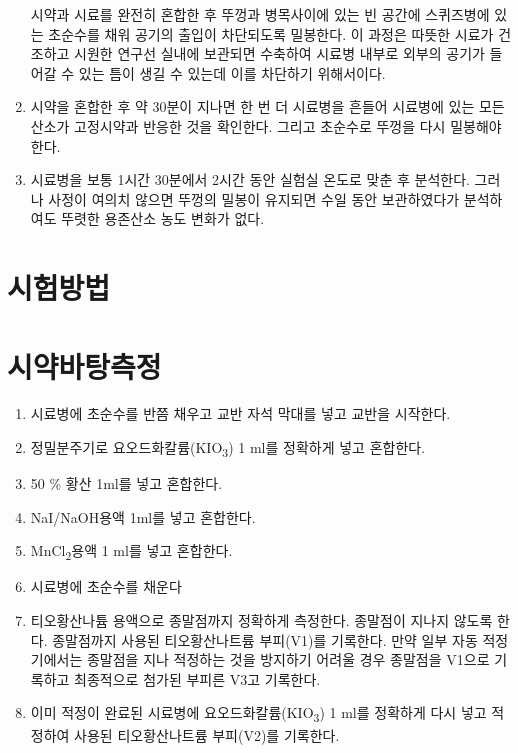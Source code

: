 \documentclass[
]{book}
\providecommand{\tightlist}{%
  \setlength{\itemsep}{0pt}\setlength{\parskip}{0pt}}
\begin{document}
\begin{enumerate}
  시약과 시료를 완전히 혼합한 후 뚜껑과 병목사이에 있는 빈 공간에 스퀴즈병에 있는 초순수를 채워 공기의 출입이 차단되도록 밀봉한다. 이 과정은 따뜻한 시료가 건조하고 시원한 연구선 실내에 보관되면 수축하여 시료병 내부로 외부의 공기가 들어갈 수 있는 틈이 생길 수 있는데 이를 차단하기 위해서이다.
\item
  시약을 혼합한 후 약 30분이 지나면 한 번 더 시료병을 흔들어 시료병에 있는 모든 산소가 고정시약과 반응한 것을 확인한다. 그리고 초순수로 뚜껑을 다시 밀봉해야 한다.
\item
  시료병을 보통 1시간 30분에서 2시간 동안 실험실 온도로 맞춘 후 분석한다. 그러나 사정이 여의치 않으면 뚜껑의 밀봉이 유지되면 수일 동안 보관하였다가 분석하여도 뚜렷한 용존산소 농도 변화가 없다.
\end{enumerate}

\hypertarget{uxc2dcuxd5d8uxbc29uxbc95-1}{%
\section{시험방법}\label{uxc2dcuxd5d8uxbc29uxbc95-1}}

\hypertarget{uxc2dcuxc57duxbc14uxd0d5uxce21uxc815}{%
\section{시약바탕측정}\label{uxc2dcuxc57duxbc14uxd0d5uxce21uxc815}}

\begin{enumerate}
\def\labelenumi{\arabic{enumi}.}
\tightlist
\item
  시료병에 초순수를 반쯤 채우고 교반 자석 막대를 넣고 교반을 시작한다.
\item
  정밀분주기로 요오드화칼륨(KIO\textsubscript{3}) 1 ml를 정확하게 넣고 혼합한다.
\item
  50 \% 황산 1ml를 넣고 혼합한다.
\item
  NaI/NaOH용액 1ml를 넣고 혼합한다.
\item
  MnCl\textsubscript{2}용액 1 ml를 넣고 혼합한다.
\item
  시료병에 초순수를 채운다
\item
  티오황산나튬 용액으로 종말점까지 정확하게 측정한다. 종말점이 지나지 않도록 한다. 종말점까지 사용된 티오황산나트륨 부피(V1)를 기록한다. 만약 일부 자동 적정기에서는 종말점을 지나 적정하는 것을 방지하기 어려울 경우 종말점을 V1으로 기록하고 최종적으로 첨가된 부피른 V3고 기록한다.
\item
  이미 적정이 완료된 시료병에 요오드화칼륨(KIO\textsubscript{3}) 1 ml를 정확하게 다시 넣고 적정하여 사용된 티오황산나트륨 부피(V2)를 기록한다.
\end{enumerate}
\end{document}

